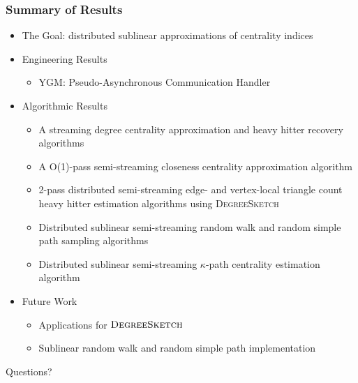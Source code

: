 \documentclass{beamer}
\newcommand{\algoname}[1]{\textnormal{\textsc{#1}}}
\begin{document}
\begin{frame}
\frametitle{Summary of Results}

\begin{itemize}
	\item The Goal: distributed sublinear approximations of centrality indices
	\item Engineering Results
	\begin{itemize}
		\item \algoname{YGM}: Pseudo-Asynchronous 	Communication Handler
	\end{itemize}
	\item Algorithmic Results
	\begin{itemize}
		\item A streaming degree centrality approximation and heavy hitter recovery algorithms
		\item A O(1)-pass semi-streaming closeness centrality approximation algorithm
		\item 2-pass distributed semi-streaming edge- and vertex-local triangle count heavy hitter estimation algorithms using \algoname{DegreeSketch}
		\item Distributed sublinear semi-streaming random walk and random simple path sampling algorithms
		\item Distributed sublinear semi-streaming $\kappa$-path centrality estimation algorithm
	\end{itemize}
	\item Future Work
	\begin{itemize}
		\item Applications for $\algoname{DegreeSketch}$
		\item Sublinear random walk and random simple path implementation
	\end{itemize}
\end{itemize}

\end{frame}




\begin{frame}

\begin{center}
{\Huge Questions?}
\end{center}

\end{frame}


 
 
%
\end{document}

